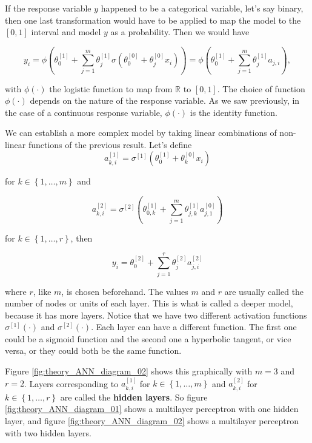 If the response variable $y$ happened to be a categorical variable, let's say binary, then one last transformation would have to be applied to map the model to the $\left[0, 1\right]$ interval and model $y$ as a probability. Then we would have

$$
  y_i =
  \phi \left( \theta_0^{[1]} +  \sum_{j = 1}^m \theta_j^{[1]} \sigma \left( \theta_0^{[0]} + \theta_j^{[0]} x_i \right) \right) =
  \phi \left( \theta_0^{[1]} +  \sum_{j = 1}^m \theta_j^{[1]} a_{j,i} \right),
$$

with $\phi(\cdot)$ the logistic function to map from $\mathbb{R}$ to $\left[ 0, 1 \right]$. The choice of function $\phi(\cdot)$ depends on the nature of the response variable. As we saw previously, in the case of a continuous response variable, $\phi(\cdot)$ is the identity function.

We can establish a more complex model by taking linear combinations of non-linear functions of the previous result. Let's define
$$
a_{k,i}^{[1]} = \sigma^{[1]} \left( \theta_{0}^{[1]} + \theta_k^{[0]} x_i \right)
$$

for $k \in \left\{ 1, \ldots, m \right\}$ and

$$
  a_{k,i}^{[2]} = \sigma^{[2]} \left(  \theta_{0,k}^{[1]} + \sum_{j = 1}^m \theta_{j,k}^{[1]} a_{j,1}^{[0]}  \right)
$$


for $k \in \left\{ 1, \ldots, r \right\}$, then

$$
  y_i = \theta_0^{[2]} + \sum_{j = 1}^r \theta_j^{[2]} a_{j,i}^{[2]}
$$

where $r$, like $m$, is chosen beforehand. The values $m$ and $r$ are usually called the number of nodes or units of each layer. This is what is called a deeper model, because it has more layers. Notice that we have two different activation functions $\sigma^{[1]}(\cdot)$ and $\sigma^{[2]}(\cdot)$. Each layer can have a different function. The first one could be a sigmoid function and the second one a hyperbolic tangent, or vice versa, or they could both be the same function.

Figure \ref{fig:theory_ANN_diagram_02} shows this graphically with $m = 3$ and $r = 2$. Layers corresponding to $a_{k,i}^{[1]}$ for $k \in \left\{ 1, \ldots, m \right\}$ and $a_{k,i}^{[2]}$ for $k \in \left\{ 1, \ldots, r \right\}$ are called the \textbf{hidden layers}. So figure \ref{fig:theory_ANN_diagram_01} shows a multilayer perceptron with one hidden layer, and figure \ref{fig:theory_ANN_diagram_02} shows a multilayer perceptron with two hidden layers.


